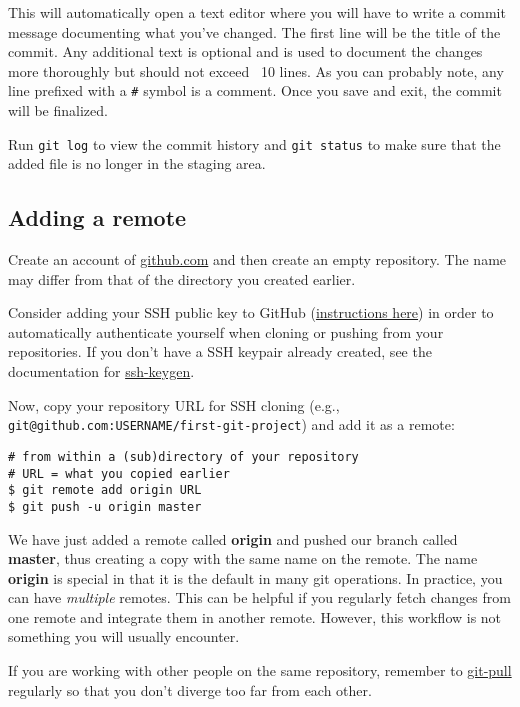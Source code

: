 This will automatically open a text editor where you will have to write a
commit message documenting what you've changed. The first line will be the title
of the commit. Any additional text is optional and is used to document the
changes more thoroughly but should not exceed ~10 lines. As you can probably
note, any line prefixed with a \texttt{\#} symbol is a comment. Once you save
and exit, the commit will be finalized.

Run \texttt{git log} to view the commit history and \texttt{git status} to make
sure that the added file is no longer in the staging area.

\subsection{Adding a remote}

Create an account of \href{https://github.com/}{github.com} and then create an
empty repository. The name may differ from that of the directory you created
earlier.

Consider adding your SSH public key to GitHub (\href{https://docs.github.com/en/authentication/connecting-to-github-with-ssh/adding-a-new-ssh-key-to-your-github-account}{instructions here})
in order to automatically authenticate yourself when cloning or pushing from
your repositories. If you don't have a SSH keypair already created, see the
documentation for \href{https://man.archlinux.org/man/ssh-keygen.1}
{ssh-keygen}.

Now, copy your repository URL for SSH cloning (e.g.,
\texttt{git@github.com:USERNAME/first-git-project}) and add it as a remote:

\begin{lstlisting}[style=bashstyle]
# from within a (sub)directory of your repository
# URL = what you copied earlier
$ git remote add origin URL
$ git push -u origin master
\end{lstlisting}

We have just added a remote called \textbf{origin} and pushed our branch called
\textbf{master}, thus creating a copy with the same name on the remote. The name
\textbf{origin} is special in that it is the default in many git operations. In
practice, you can have \textit{multiple} remotes. This can be helpful if you
regularly fetch changes from one remote and integrate them in another remote.
However, this workflow is not something you will usually encounter.

If you are working with other people on the same repository, remember to
\href{https://man.archlinux.org/man/git-pull.1}{git-pull} regularly so that you
don't diverge too far from each other.

